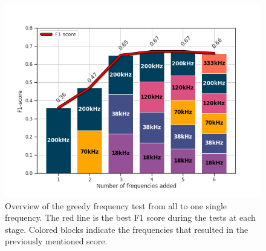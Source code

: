     \clearpage
    \begin{figure}[H]
        \centering
        \includegraphics[scale=0.7]{figures/increasing_freq_f1.png}
        \caption{Overview of the greedy frequency test from all to one single frequency. The red line is the best F1 score during the tests at each stage. Colored blocks indicate the frequencies that resulted in the previously mentioned score.}
      	\medskip 
        \label{increasing_freq_f1_score_fig}
    \end{figure}
    
